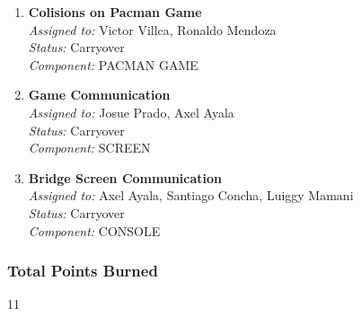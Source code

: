 \begin{enumerate}
    \item \textbf{Colisions on Pacman Game} \\
    \textit{Assigned to:} Victor Villca, Ronaldo Mendoza \\
    \textit{Status:} Carryover \\
    \textit{Component:} PACMAN GAME
    \item \textbf{Game Communication} \\
    \textit{Assigned to:} Josue Prado, Axel Ayala \\
    \textit{Status:} Carryover \\
    \textit{Component:} SCREEN
    \item \textbf{Bridge Screen Communication } \\
    \textit{Assigned to:} Axel Ayala, Santiago Concha, Luiggy Mamani \\
    \textit{Status:} Carryover \\
    \textit{Component:} CONSOLE
\end{enumerate}

\subsubsection*{Total Points Burned}
11

